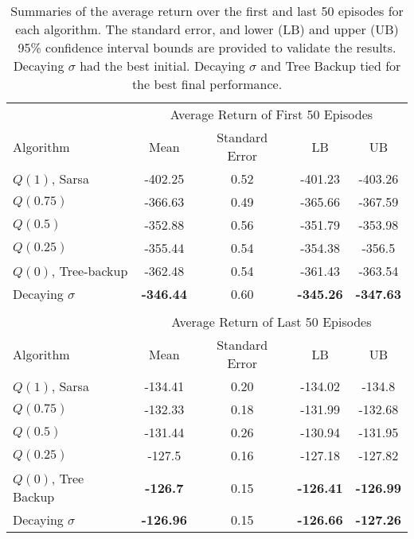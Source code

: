 \begin{table}[t] 
\caption[Experiment Results in the Mountain Cliff Environment in Terms of Initial and Final Performance]{
Summaries of the average return over the first and last 50 episodes for each algorithm.
The standard error, and lower (LB) and upper (UB) 95\% confidence interval bounds are provided to validate the results.
Decaying $\sigma$ had the best initial.
Decaying $\sigma$ and Tree Backup tied for the best final performance.
}
\label{tbl:mountain_cliff_results}
\begin{center}
\begin{tabular}{lcccc}
\toprule
& \multicolumn{4}{c}{Average Return of First 50 Episodes} \\
\cmidrule{2-5}
Algorithm & Mean & Standard Error & LB & UB \\
\midrule
$Q(1)$, Sarsa 		& -402.25           & 0.52  & -401.23           & -403.26   \\
$Q(0.75)$  			& -366.63           & 0.49  & -365.66           & -367.59   \\
$Q(0.5)$  			& -352.88           & 0.56  & -351.79           & -353.98   \\
$Q(0.25)$  			& -355.44           & 0.54  & -354.38           & -356.5    \\
$Q(0)$, Tree-backup & -362.48           & 0.54  & -361.43           & -363.54   \\
Decaying $\sigma$ 	& \textbf{-346.44}  & 0.60  & \textbf{-345.26}  & \textbf{-347.63}   \\
\bottomrule
&&&& \\
\toprule
& \multicolumn{4}{c}{Average Return of Last 50 Episodes} \\
\cmidrule{2-5}
Algorithm & Mean & Standard Error & LB & UB \\
\midrule
$Q(1)$, Sarsa 		& -134.41           & 0.20  & -134.02	        & -134.8    \\
$Q(0.75)$  			& -132.33           & 0.18  & -131.99	        & -132.68   \\
$Q(0.5)$  			& -131.44           & 0.26  & -130.94	        & -131.95   \\
$Q(0.25)$  			& -127.5            & 0.16  & -127.18	        & -127.82   \\
$Q(0)$, Tree Backup & \textbf{-126.7}   & 0.15  & \textbf{-126.41}	& \textbf{-126.99} \\
Decaying $\sigma$ 	& \textbf{-126.96}  & 0.15  & \textbf{-126.66}  & \textbf{-127.26}  \\
\bottomrule
\end{tabular}
\end{center}
\end{table}

